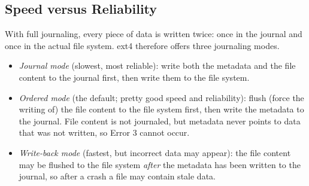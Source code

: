 \subsection{Speed versus Reliability}

With full journaling, every piece of data is written twice: once in the journal and once in the actual file system. ext4 therefore offers three journaling modes.
\begin{itemize}
  \item \emph{Journal mode} (slowest, most reliable): write both the metadata and the file content to the journal first, then write them to the file system.
  \item \emph{Ordered mode} (the default; pretty good speed and reliability): flush (force the writing of) the file content to the file system first, then write the metadata to the journal. File content is not journaled, but metadata never points to data that was not written, so Error 3 cannot occur.
  \item \emph{Write-back mode} (fastest, but incorrect data may appear): the file content may be flushed to the file system \emph{after} the metadata has been written to the journal, so after a crash a file may contain stale data.
\end{itemize}
